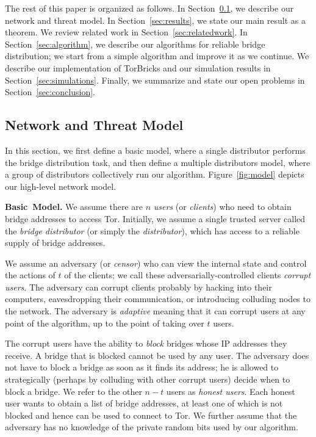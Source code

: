 \documentclass[letterpaper,twocolumn,10pt]{article}
\newcommand{\fullpaper}[1]{#1}
\newcommand{\fullpaper}[1]{}
\newcommand{\bricks}{}
\def\bricks/{\mbox{TorBricks}}
\newcommand{\sfsize}{\fontsize{0.68\baselineskip}{0.68\baselineskip}\selectfont}
\newcommand{\sans}[1]{\textbf{\textsf{\sfsize \mbox{#1}}}}
\newcommand{\para}[1]{\vspace{0.55em} \noindent \sans{{\mbox{#1}}}}
\begin{document}
The rest of this paper is organized as follows. In Section~\ref{sec:model}, we describe our network and threat model. In Section~\ref{sec:results}, we state our main result as a theorem. We review related work in Section~\ref{sec:relatedwork}. In Section~\ref{sec:algorithm}, we describe our algorithms for reliable bridge distribution; we start from a simple algorithm and improve it as we continue. We describe our implementation of \bricks/ and our simulation results in Section~\ref{sec:simulations}. Finally, we summarize and state our open problems in Section~\ref{sec:conclusion}.

\subsection{Network and Threat Model} \label{sec:model}

In this section, we first define a basic model, where a single distributor performs the bridge distribution task, and then define a multiple distributors model, where a group of distributors collectively run our algorithm. Figure~\ref{fig:model} depicts our high-level network model.

\para{Basic Model.}
We assume there are $n$ \emph{users} (or \emph{clients}) who need to obtain bridge addresses to access Tor. Initially, we assume a single trusted server called the \emph{bridge distributor} (or simply the \emph{distributor}), which has access to a reliable supply of bridge addresses.%

We assume an adversary (or \emph{censor}) who can view the internal state and control the actions of $t$ of the clients; we call these adversarially-controlled clients \emph{corrupt users}. \fullpaper{The adversary can corrupt clients probably by hacking into their computers, eavesdropping their communication, or introducing colluding nodes to the network.}
The adversary is \emph{adaptive} meaning that it can corrupt users at any point of the algorithm, up to the point of taking over $t$ users.

The corrupt users have the ability to \emph{block} bridges whose IP addresses they receive. A bridge that is blocked cannot be used by any user.
The adversary does not have to block a bridge as soon as it finds its address; he is allowed to strategically (perhaps by colluding with other corrupt users) decide when to block a bridge. 
We refer to the other ${n-t}$ users as \emph{honest users}. Each honest user wants to obtain a list of bridge addresses, at least one of which is not blocked and hence can be used to connect to Tor. 
We further assume that the adversary has no knowledge of the private random bits used by our algorithm.
\end{document}
